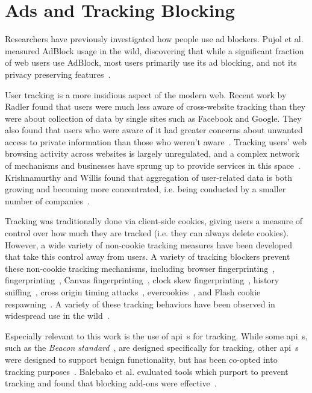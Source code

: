 \section{Ads and Tracking Blocking}
\label{background:ads-tracking-blocking}

Researchers have previously investigated how people use ad blockers.
Pujol et al. measured AdBlock usage in the wild, discovering that while a
significant fraction of web users use AdBlock, most users
primarily use its ad blocking, and not its privacy preserving
features~\cite{pujolannoyed}.

User tracking is a more insidious aspect of the modern web. Recent work by Radler
found that users were much less aware of cross-website tracking than they were
about collection of data by single sites such as Facebook and Google. They also
found that users who were aware of it had greater concerns about unwanted
access to private information than those who weren't
aware~\cite{rader2014awareness}.  Tracking users' web browsing activity across
websites is largely unregulated, and a complex network of mechanisms and
businesses have sprung up to provide services in this
space~\cite{falahrastegar2014anatomy}.  Krishnamurthy and Willis found that
aggregation of user-related data is both growing and becoming more
concentrated, i.e. being conducted by a smaller number of
companies~\cite{krishnamurthy2009privacy}.

Tracking was traditionally done via client-side cookies, giving users a measure
of control over how much they are tracked (i.e. they can always delete
cookies).  However, a wide variety of non-cookie tracking measures have been
developed that take this control away from users. A variety of tracking
blockers prevent these non-cookie tracking mechanisms, including browser
fingerprinting~\cite{eckersley2010unique}, \JS
fingerprinting~\cite{mowery2011fingerprinting,mulazzani2013fast}, Canvas
fingerprinting~\cite{mowery2012pixel}, clock skew
fingerprinting~\cite{kohno2005remote}, history
sniffing~\cite{jang2010empirical}, cross origin timing
attacks~\cite{van2015clock}, evercookies~\cite{evercookies}, and Flash cookie
respawning~\cite{soltani2010flash,ayenson2011flash}.  A variety of these
tracking behaviors have been observed in widespread use in the
wild~\cite{soltani2010flash,ayenson2011flash,acar2014web,nikiforakis2013cookieless,mcdonald2011survey,olejnik2014selling,sorensen2013zombie}.

Especially relevant to this work is the use of \JS \gls{api}~s for tracking.
While some \gls{api}~s, such as the \textit{Beacon standard}~\cite{beaconapi},
are designed specifically for tracking, other \gls{api}~s were designed to support
benign functionality, but has been co-opted into tracking
purposes~\cite{mowery2012pixel,fingerprintjs2}.  Balebako et al. evaluated
tools which purport to prevent tracking and found that blocking add-ons were
effective~\cite{balebako2012measuring}.
